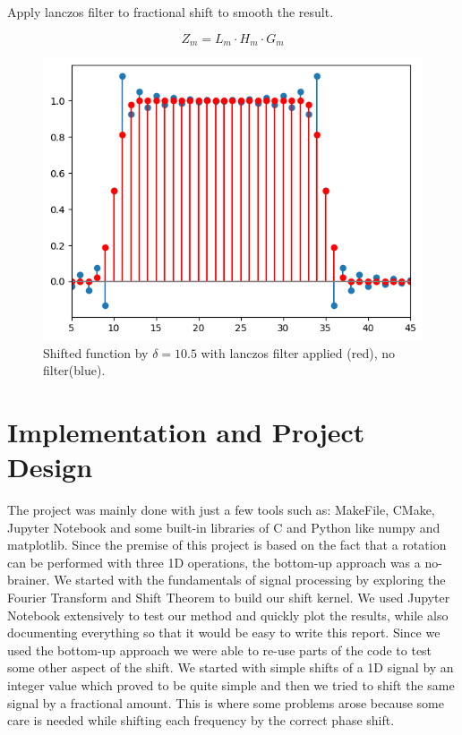 \documentclass[]{usiinfbachelorproject}
\begin{document}
	Apply lanczos filter to fractional shift to smooth the result.
	
	\begin{equation*}
		Z_m = L_m \cdot H_m \cdot G_m
	\end{equation*}
	
	\begin{figure}[h]
		\centering
		\includegraphics[width=0.5\columnwidth]{images/box_shifted_lanczos_delta10_1_n50.png}
		\caption{Shifted function by $\delta=10.5$ with lanczos filter applied (red), no filter(blue).}
	\end{figure}
	
	\fi
	
	\newpage
	
	\section{Implementation and Project Design}
		The project was mainly done with just a few tools such as: MakeFile, CMake, Jupyter Notebook and some built-in libraries of C and Python like numpy and matplotlib.
		Since the premise of this project is based on the fact that a rotation can be performed with three 1D operations, the bottom-up approach was a no-brainer. We started with the fundamentals of signal processing by exploring the Fourier Transform and Shift Theorem to build our shift kernel. We used Jupyter Notebook extensively to test our method and quickly plot the results, while also documenting everything so that it would be easy to write this report. Since we used the bottom-up approach we were able to re-use parts of the code to test some other aspect of the shift. We started with simple shifts of a 1D signal by an integer value which proved to be quite simple and then we tried to shift the same signal by a fractional amount. This is where some problems arose because some care is needed while shifting each frequency by the correct phase shift.
		
		
\end{document}
